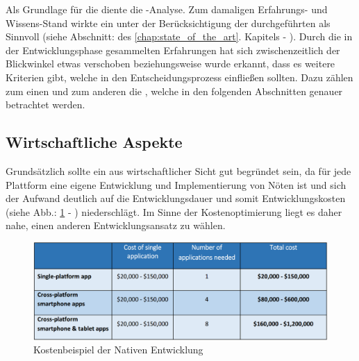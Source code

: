 \documentclass[Bachelorarbeit.tex]{subfiles}
\begin{document}
Als Grundlage für die  diente die -Analyse.
Zum damaligen Erfahrungs- und Wissens-Stand wirkte ein  unter der Berücksichtigung der durchgeführten  als Sinnvoll (siehe Abschnitt:  des \ref{chap:state_of_the_art}. Kapitels - ). 
Durch die in der Entwicklungsphase gesammelten Erfahrungen hat sich zwischenzeitlich der Blickwinkel etwas verschoben
beziehungsweise wurde erkannt, dass es weitere Kriterien gibt, welche in den Entscheidungsprozess einfließen sollten.
Dazu zählen zum einen  und zum anderen die , welche in den folgenden Abschnitten genauer betrachtet werden.
\newpage
\subsection*{Wirtschaftliche Aspekte}\label{subsubsec:wirtschaftliche-aspekte}

Grundsätzlich sollte ein  aus wirtschaftlicher Sicht gut begründet sein, da für jede Plattform eine eigene Entwicklung und Implementierung von Nöten ist und sich der Aufwand deutlich auf die Entwicklungsdauer und somit Entwicklungskosten
 (siehe Abb.: \ref{fig:kostenNativeEntwick} - ) niederschlägt. 
 Im Sinne der Kostenoptimierung liegt es daher nahe, einen anderen Entwicklungsansatz zu wählen.\\
 
 
 
 \begin{figure}[h]
 \centering
 \includegraphics[width=0.8\linewidth]{./img/kostenNativeEntwick}
 \caption[Kosten: Native Entwicklung]{Kostenbeispiel der  Nativen Entwicklung \parencite[Quelle:][]{kostenNativApp}}
 \label{fig:kostenNativeEntwick}
 \end{figure}
\end{document}
